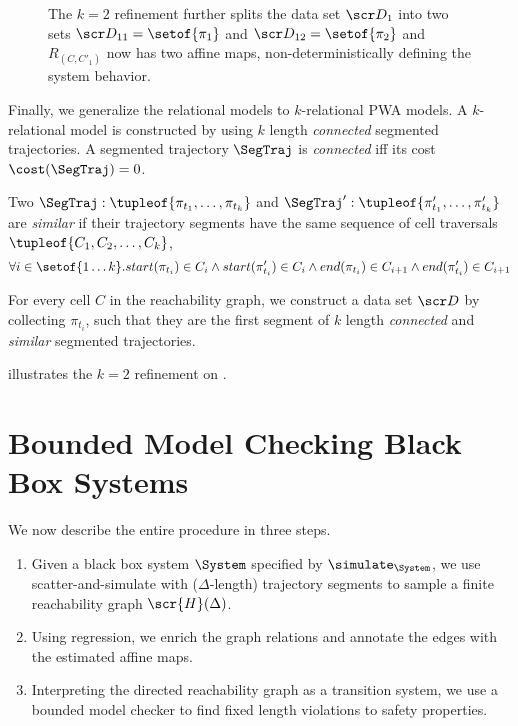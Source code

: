 \begin{figure}[!htbp]
\begin{center}
\begin{tikzpicture}
\end{tikzpicture}
\end{center}
\vspace*{-.3cm}
\caption{The $k=2$ refinement further splits the data set $\ds_1$
    into two sets $\ds_{11} = \setof{\pi_1}$ and $\ds_{12} =
    \setof{\pi_2}$ and $R_{(C,C'_1)}$ now has two affine maps,
    non-deterministically defining the system behavior.}
\label{fig:k2}
\vspace*{-.3cm}
\end{figure}

Finally, we generalize the relational models to $k$-relational PWA
models. A $k$-relational model is constructed by using $k$ length
\textit{connected} segmented trajectories. A segmented trajectory $\SegTraj$ is
\textit{connected} iff its cost $\cost(\SegTraj) = 0$.

Two $\SegTraj:\tupleof{\pi_{t_1}, \ldots, \pi_{t_k}}$ and
$\SegTraj':\tupleof{\pi'_{t_1}, \ldots, \pi'_{t_k}}$ are
\textit{similar} if their trajectory segments have the same sequence
of cell traversals $\tupleof{C_1, C_2, \ldots, C_k}$, \ie
\[
    \forall i\in\setof{1 \ldots k}.
    start(\pi_{t_i}) \in C_i
    \land start(\pi'_{t_i}) \in C_i
    \land end(\pi_{t_i}) \in C_{i+1}
    \land end(\pi'_{t_i}) \in C_{i+1}
\]

For every cell $C$ in the reachability graph, we construct a data set
$\ds$ by collecting $\pi_{t_i}$, such that they are the first segment of $k$
length \textit{connected} and \textit{similar} segmented trajectories.

 illustrates the $k=2$ refinement on .

\section{Bounded Model Checking Black Box Systems}
We now describe the entire procedure in three steps.
\begin{enumerate}
    \item Given a black box system $\System$ specified by
        $\simulate_\System$, we
        use scatter-and-simulate with ($\Delta$-length) trajectory
        segments to sample a finite reachability graph
        $\scr{H}(\Delta)$.
    \item Using regression, we enrich the graph relations and annotate
        the edges with the estimated affine maps.
    \item Interpreting the directed reachability graph as a transition
        system, we use a bounded model checker to find fixed length
        violations to safety properties.
\end{enumerate}


